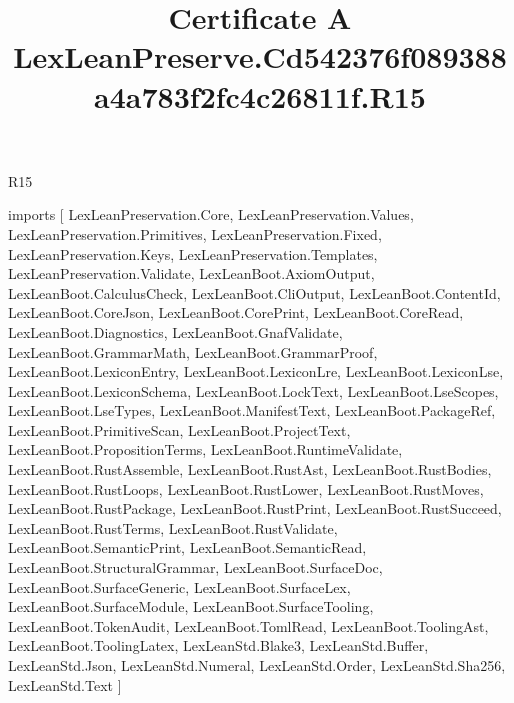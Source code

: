 \begin{lexlean}{R15}
\title{Certificate A LexLeanPreserve.Cd542376f089388a4a783f2fc4c26811f.R15}
\begin{coremodule}
imports [
  LexLeanPreservation.Core,
  LexLeanPreservation.Values,
  LexLeanPreservation.Primitives,
  LexLeanPreservation.Fixed,
  LexLeanPreservation.Keys,
  LexLeanPreservation.Templates,
  LexLeanPreservation.Validate,
  LexLeanBoot.AxiomOutput,
  LexLeanBoot.CalculusCheck,
  LexLeanBoot.CliOutput,
  LexLeanBoot.ContentId,
  LexLeanBoot.CoreJson,
  LexLeanBoot.CorePrint,
  LexLeanBoot.CoreRead,
  LexLeanBoot.Diagnostics,
  LexLeanBoot.GnafValidate,
  LexLeanBoot.GrammarMath,
  LexLeanBoot.GrammarProof,
  LexLeanBoot.LexiconEntry,
  LexLeanBoot.LexiconLre,
  LexLeanBoot.LexiconLse,
  LexLeanBoot.LexiconSchema,
  LexLeanBoot.LockText,
  LexLeanBoot.LseScopes,
  LexLeanBoot.LseTypes,
  LexLeanBoot.ManifestText,
  LexLeanBoot.PackageRef,
  LexLeanBoot.PrimitiveScan,
  LexLeanBoot.ProjectText,
  LexLeanBoot.PropositionTerms,
  LexLeanBoot.RuntimeValidate,
  LexLeanBoot.RustAssemble,
  LexLeanBoot.RustAst,
  LexLeanBoot.RustBodies,
  LexLeanBoot.RustLoops,
  LexLeanBoot.RustLower,
  LexLeanBoot.RustMoves,
  LexLeanBoot.RustPackage,
  LexLeanBoot.RustPrint,
  LexLeanBoot.RustSucceed,
  LexLeanBoot.RustTerms,
  LexLeanBoot.RustValidate,
  LexLeanBoot.SemanticPrint,
  LexLeanBoot.SemanticRead,
  LexLeanBoot.StructuralGrammar,
  LexLeanBoot.SurfaceDoc,
  LexLeanBoot.SurfaceGeneric,
  LexLeanBoot.SurfaceLex,
  LexLeanBoot.SurfaceModule,
  LexLeanBoot.SurfaceTooling,
  LexLeanBoot.TokenAudit,
  LexLeanBoot.TomlRead,
  LexLeanBoot.ToolingAst,
  LexLeanBoot.ToolingLatex,
  LexLeanStd.Blake3,
  LexLeanStd.Buffer,
  LexLeanStd.Json,
  LexLeanStd.Numeral,
  LexLeanStd.Order,
  LexLeanStd.Sha256,
  LexLeanStd.Text
]


\end{coremodule}
\end{lexlean}
